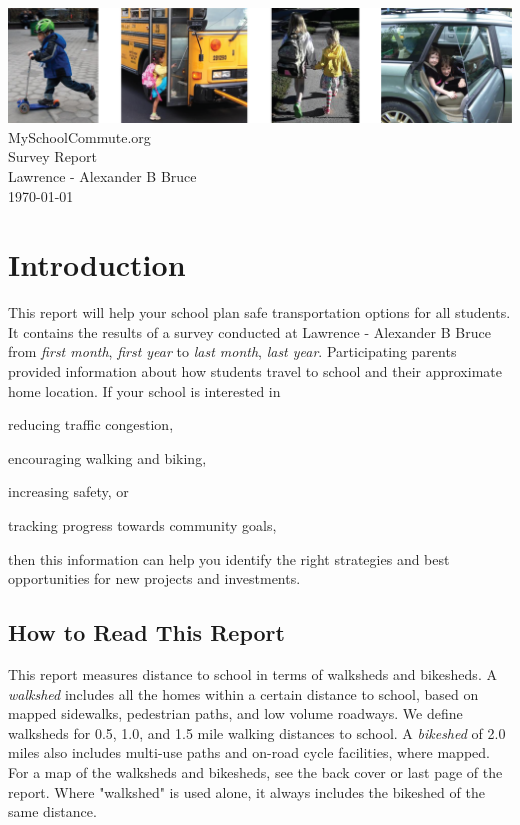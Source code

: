 \documentclass[12pt,letterpaper]{report}\usepackage{graphicx, color}
\newenvironment{itemize*}%
  {\begin{itemize}%
    \setlength{\itemsep}{0pt}%
    \setlength{\parskip}{0pt}}%
  {\end{itemize}}
\begin{document}
{\flushleft   
\includegraphics[height=32 mm]{KidsAreCommutersToo_TitleImage}
  {
    MySchoolCommute.org\\
    Survey Report\\
    Lawrence - Alexander B Bruce\\ 
  }                                 
\today \\     
}

\section*{Introduction}
This report will help your school plan safe transportation options for all students. It contains the results of a survey conducted at Lawrence - Alexander B Bruce from \emph{first month}, \emph{first year} to \emph{last month}, \emph{last year}. Participating parents provided information about how students travel to school and their approximate home location. If your school is interested in 
\begin{itemize*}
\item reducing traffic congestion,
\item encouraging walking and biking,
\item increasing safety, or
\item tracking progress towards community goals,
\end{itemize*}
then this information can help you identify the right strategies and best opportunities 
for new projects and investments. 

\subsection*{How to Read This Report}
This report measures distance to school in terms of walksheds and bikesheds. A \emph{walkshed} includes all the homes within a certain distance to school, based on mapped sidewalks, pedestrian paths, and low volume roadways. We define walksheds for 0.5, 1.0, and 1.5 mile walking distances to school. A \emph{bikeshed} of 2.0 miles also includes multi-use paths and on-road cycle facilities, where mapped. For a map of the walksheds and bikesheds, see the back cover or last page of the report. Where "walkshed" is used alone, it always includes the bikeshed of the same distance.
\newpage
\end{document}
